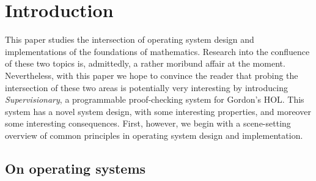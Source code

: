 \documentclass[a4paper, UKenglish, cleveref, autoref, thm-restate, colorlinks]{lipics-v2021}
\begin{document}
\section{Introduction}
\label{sect.introduction}

This paper studies the intersection of operating system design and implementations of the foundations of mathematics.
Research into the confluence of these two topics is, admittedly, a rather moribund affair at the moment.
Nevertheless, with this paper we hope to convince the reader that probing the intersection of these two areas is potentially very interesting by introducing \emph{Supervisionary}, a programmable proof-checking system for Gordon's HOL.
This system has a novel system design, with some interesting properties, and moreover some interesting consequences.
First, however, we begin with a scene-setting overview of common principles in operating system design and implementation.

\subsection{On operating systems}
\end{document}
